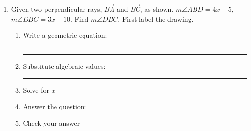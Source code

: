 \documentclass[12pt, oneside]{article}
\begin{document}
\begin{enumerate}
  \item Given two perpendicular rays, $\overrightarrow{BA}$ and $\overrightarrow{BC}$, as shown. $m \angle ABD = 4x-5$, $m \angle DBC = 3x-10$. Find $m \angle DBC$.
    First label the drawing.
    \begin{flushright}
    \end{flushright}
    \begin{enumerate}
      \item Write a geometric equation: \rule{4cm}{0.15mm} \hspace{1cm} \rule{4cm}{0.15mm}
      \vspace{.5cm}
      \item Substitute algebraic values: \rule{4cm}{0.15mm} \bigskip
      \item Solve for $x$
      \vspace{2cm}
      \item Answer the question:
      \vspace{2cm}
      \item Check your answer
    \end{enumerate}


\end{enumerate}
\end{document}
